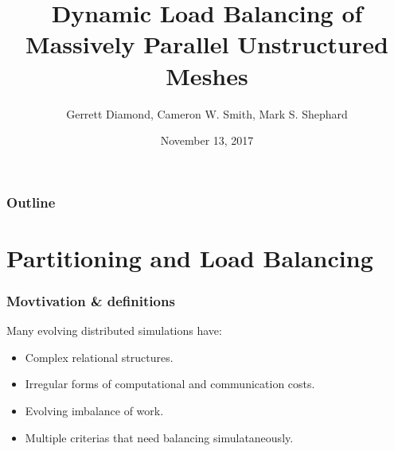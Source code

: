 \documentclass{beamer}
\begin{document}
\title[Unstructured Mesh Workflows]
{
Dynamic Load Balancing of Massively Parallel Unstructured Meshes
}
\author{Gerrett Diamond, Cameron W. Smith, Mark S. Shephard}


\date{November 13, 2017}

\begin{frame}[plain]
  \titlepage
\end{frame}

\begin{frame}
  \frametitle{Outline}
  \tableofcontents
\end{frame}

\section{Partitioning and Load Balancing}
\begin{frame}
  \frametitle{Movtivation \& definitions}
  Many evolving distributed simulations have: \\
  \begin{itemize}
    \item Complex relational structures.
    \item Irregular forms of computational and communication costs.
    \item Evolving imbalance of work. %
    \item Multiple criterias that need balancing simulataneously.
  \end{itemize}
\end{frame}
\end{document}
